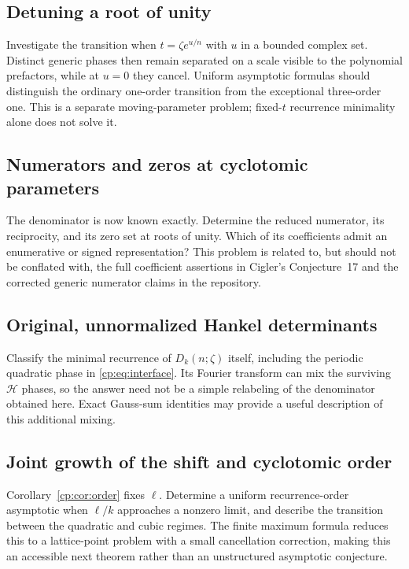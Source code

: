 \documentclass[11pt]{article}
\theoremstyle{definition}
\theoremstyle{remark}
\newcommand{\Ht}{\mathcal H}
\theoremstyle{definition}
\theoremstyle{plain}
\numberwithin{equation}{section}
\begin{document}
\subsection{Detuning a root of unity}
\label{cp:q:detuning}
Investigate the transition when $t=\zeta e^{u/n}$ with $u$ in a bounded
complex set. Distinct generic phases then remain separated on a scale
visible to the polynomial prefactors, while at $u=0$ they cancel.
Uniform asymptotic formulas should distinguish the ordinary one-order
transition from the exceptional three-order one. This is a separate
moving-parameter problem; fixed-$t$ recurrence minimality alone does not
solve it.

\subsection{Numerators and zeros at cyclotomic parameters}
\label{cp:q:numerators}
The denominator is now known exactly. Determine the reduced numerator,
its reciprocity, and its zero set at roots of unity. Which of its
coefficients admit an enumerative or signed representation? This problem
is related to, but should not be conflated with, the full coefficient
assertions in Cigler's Conjecture~17 and the corrected generic numerator
claims in the repository.


\subsection{Original, unnormalized Hankel determinants}
\label{cp:q:unnormalized}
Classify the minimal recurrence of $D_k(n;\zeta)$ itself, including the
periodic quadratic phase in \eqref{cp:eq:interface}. Its Fourier transform
can mix the surviving $\Ht$ phases, so the answer need not be a simple
relabeling of the denominator obtained here. Exact Gauss-sum identities
may provide a useful description of this additional mixing.

\subsection{Joint growth of the shift and cyclotomic order}
\label{cp:q:joint}
Corollary~\ref{cp:cor:order} fixes $\ell$. Determine a uniform recurrence-order
asymptotic when $\ell/k$ approaches a nonzero limit, and describe the
transition between the quadratic and cubic regimes. The finite maximum
formula reduces this to a lattice-point problem with a small cancellation
correction, making this an accessible next theorem rather than an
unstructured asymptotic conjecture.
\end{document}

